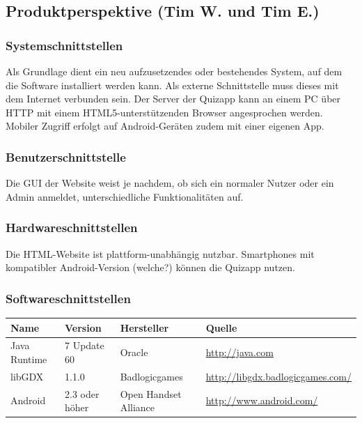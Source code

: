 \documentclass[fontsize=12pt,paper=a4,twoside]{scrartcl}
\begin{document}
\subsection{Produktperspektive (Tim W. und Tim E.)}
  
\subsubsection{Systemschnittstellen}
  
Als Grundlage dient ein neu aufzusetzendes oder bestehendes System, auf dem die Software installiert werden kann. Als externe Schnittstelle muss dieses mit dem Internet verbunden sein. Der Server der Quizapp kann an einem PC über HTTP mit einem HTML5-unterstützenden Browser angesprochen werden. Mobiler Zugriff erfolgt auf Android-Geräten zudem mit einer eigenen App.

\subsubsection{Benutzerschnittstelle}

Die GUI der Website weist je nachdem, ob sich ein normaler Nutzer oder ein Admin anmeldet, unterschiedliche Funktionalitäten auf. 

\subsubsection{Hardwareschnittstellen}

Die HTML-Website ist plattform-unabhängig nutzbar. Smartphones mit kompatibler Android-Version (welche?) können die Quizapp nutzen.


\subsubsection{Softwareschnittstellen}

 \begin{tabular}{|p{3cm}|p{3cm}|p{4cm}|p{5cm}|}\hline
    \textbf{Name} & \textbf{Version} & \textbf{Hersteller} & \textbf{Quelle} \\\hline
    Java Runtime & 7 Update 60 & Oracle & \url{http://java.com} \\\hline
    libGDX & 1.1.0  & Badlogicgames  & \url{http://libgdx.badlogicgames.com/} \\\hline
    Android & 2.3 oder höher & Open Handset Alliance & \url{http://www.android.com/} \\\hline 
  \end{tabular}
\end{document}
